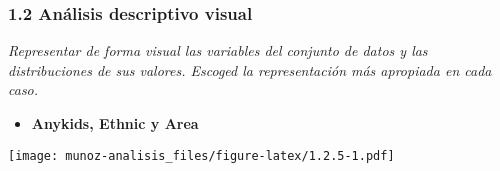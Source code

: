 \documentclass[
]{article}
\newenvironment{Shaded}{\begin{snugshade}}{\end{snugshade}}
\newcommand{\DataTypeTok}[1]{\textcolor[rgb]{0.13,0.29,0.53}{#1}}
\newcommand{\DecValTok}[1]{\textcolor[rgb]{0.00,0.00,0.81}{#1}}
\newcommand{\KeywordTok}[1]{\textcolor[rgb]{0.13,0.29,0.53}{\textbf{#1}}}
\newcommand{\NormalTok}[1]{#1}
\newcommand{\OperatorTok}[1]{\textcolor[rgb]{0.81,0.36,0.00}{\textbf{#1}}}
\newcommand{\StringTok}[1]{\textcolor[rgb]{0.31,0.60,0.02}{#1}}
\providecommand{\tightlist}{%
  \setlength{\itemsep}{0pt}\setlength{\parskip}{0pt}}
\begin{document}
\begin{Shaded}
\end{Shaded}

\hypertarget{anuxe1lisis-descriptivo-visual}{%
\subsubsection{1.2 Análisis descriptivo
visual}\label{anuxe1lisis-descriptivo-visual}}

\emph{Representar de forma visual las variables del conjunto de datos y
las distribuciones de sus valores. Escoged la representación más
apropiada en cada caso.}

\begin{itemize}
\tightlist
\item
  \textbf{Anykids, Ethnic y Area}
\end{itemize}

\begin{Shaded}
\end{Shaded}

\texttt{[image: munoz-analisis\_files/figure-latex/1.2.5-1.pdf]}

\begin{Shaded}
\end{Shaded}
\end{document}
